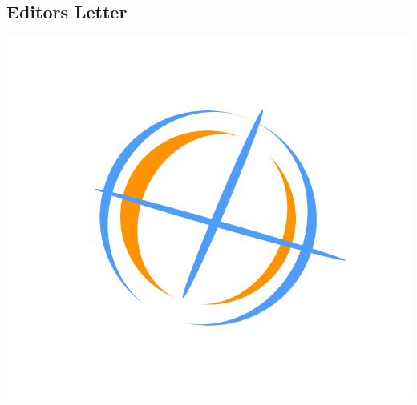 \begin{center}
	\chapter{\textbf{Editors Letter}}
\end{center}
\lipsum[1-5]
\begin{center}
	\includegraphics[scale=0.2]{logo1}
\end{center}
\clearpage